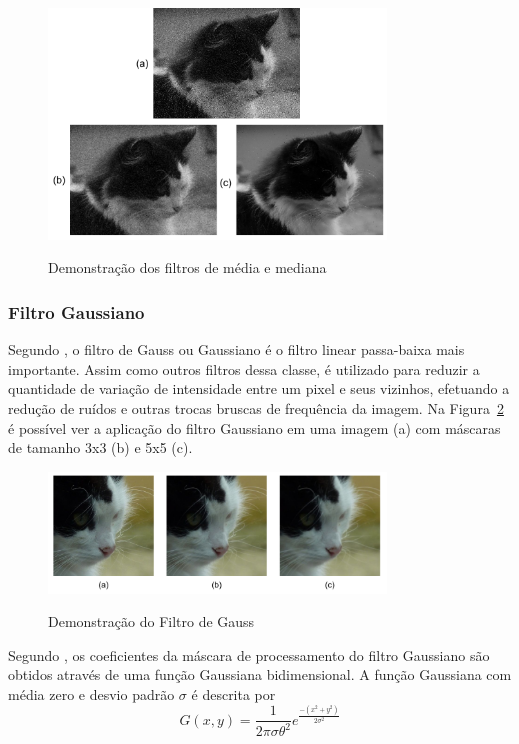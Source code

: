 \documentclass[12pt,oneside,a4paper,english,french,spanish,brazil,]{abntex2}
\begin{document}
\begin{figure}[ht]
\centering
\caption{ Demonstração dos filtros de média e mediana}
\includegraphics[width=0.8\textwidth]{imagens/PDI_Media_Mediana.pdf}
\sourceAuthor
\label{fig:PDI_Media_Mediana}
\end{figure}

\subsubsection{Filtro Gaussiano}

Segundo \citet{conci:2003}, o filtro de Gauss ou Gaussiano é o filtro linear passa-baixa mais importante. Assim como outros filtros dessa classe, é utilizado para reduzir a quantidade de variação de intensidade entre um pixel e seus vizinhos, efetuando a redução de ruídos e outras trocas bruscas de frequência da imagem. Na Figura~\ref{fig:PDI_Gauss} é possível ver a aplicação do filtro Gaussiano em uma imagem (a) com máscaras de tamanho 3x3 (b) e 5x5 (c).

\begin{figure}[ht]
\centering
\caption{Demonstração do Filtro de Gauss}
\includegraphics[width=0.8\textwidth]{imagens/PDI_Gauss.pdf}
\sourceAuthor
\label{fig:PDI_Gauss}
\end{figure}

Segundo \citet{pedrini:2008}, os coeficientes da máscara de processamento do filtro Gaussiano são obtidos através de uma função Gaussiana bidimensional. A função Gaussiana com média zero e desvio padrão \(\sigma\) é descrita por \[G(x,y)=\frac{1}{2\pi\sigma\theta^2} e^{\frac{-(x^2+y^2)}{2\sigma^2}  }\]
\end{document}
